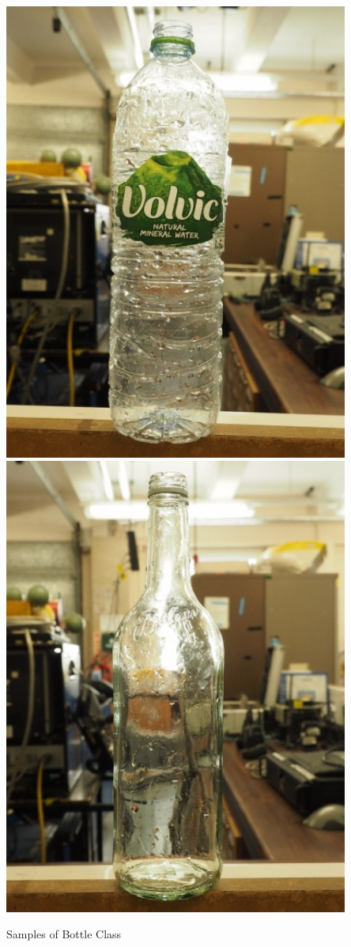 \begin{marginfigure}[1em]
    \centering
    \includegraphics[width = 0.85\textwidth]{chapters/images/dataset/plastic-bottle.jpg}
    \includegraphics[width = 0.85\textwidth]{chapters/images/dataset/glass-bottle.jpg}
    \caption{Samples of Bottle Class}
    \label{md:bottles}
\end{marginfigure}

